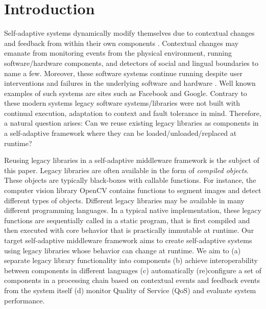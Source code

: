 \documentclass{acm_proc_article-sp}
\begin{document}



\section{Introduction}
\label{sec:introduction}

Self-adaptive systems dynamically modify themselves due to contextual changes and feedback from within their own components \cite{Oreizy}. Contextual changes may emanate from monitoring events from the physical environment, running software/hardware components, and detectors of social and lingual boundaries to name a few. Moreover, these software systems continue running  despite user interventions and failures in the underlying software and hardware \cite{Brun2009}. Well known examples of such systems are sites such as Facebook and Google.  Contrary to these modern systems legacy software systems/libraries were not built with continual execution, adaptation to context and fault tolerance in mind. Therefore, a natural question arises: Can we reuse existing legacy libraries as components in a self-adaptive framework where they can be loaded/unloaded/replaced at runtime?

Reusing legacy libraries in a self-adaptive middleware framework is the subject of this paper. Legacy libraries are often available in the form of \emph{compiled objects}. These objects are typically black-boxes with callable functions. For instance, the  computer vision library OpenCV \cite{Zelinsky2009} contains functions to segment images and detect different types of objects. Different legacy libraries may be available in many different programming languages. In a typical native implementation, these legacy functions are sequentially called in a static program, that is first compiled and then executed with core behavior that is practically immutable at runtime.   Our target self-adaptive middleware framework aims to create self-adaptive systems using legacy libraries whose behavior can change at runtime. We aim to (a) separate legacy library functionality into components (b) achieve interoperability between components in different languages (c) automatically (re)configure a set of components in a processing chain based on contextual events and feedback events from the system itself (d) monitor Quality of Service (QoS) and evaluate system performance.
\end{document}
